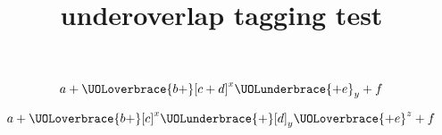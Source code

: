 \documentclass{article}
\title{underoverlap tagging test}
\begin{document}
\[ a + \UOLoverbrace{b +}[c + d]^x \UOLunderbrace{+ e}_y + f \]

\[ a + \UOLoverbrace{b +}[c]^x \UOLunderbrace{+}[d]_y \UOLoverbrace{+ e}^z + f \]
\end{document}
